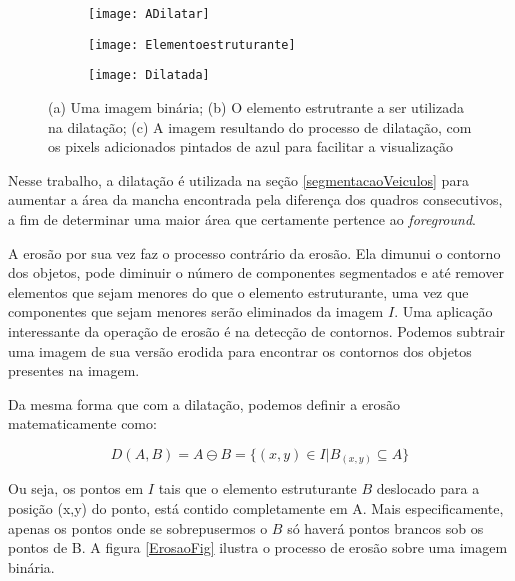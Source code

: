     \begin{figure}
 \centering
\begin{subfigure}{.5\textwidth}
  \centering
  \texttt{[image: ADilatar]}
  \caption{}
  \label{Dilatacao:sfig1}
\end{subfigure}%
\begin{subfigure}{.5\textwidth}
  \centering
  \texttt{[image: Elementoestruturante]}
  \caption{}
  \label{Dilatacao:sfig2}
\end{subfigure}


\begin{subfigure}{.5\textwidth}
  \centering
  \texttt{[image: Dilatada]}
  \caption{}
  \label{Dilatacao:sfig3}
\end{subfigure}
\caption{(a) Uma imagem binária; (b) O elemento estrutrante a ser utilizada na dilatação; (c) A imagem resultando do processo de dilatação, com os pixels adicionados pintados de azul para facilitar a visualização}
\label{DilatacaoFig}
\end{figure}


    Nesse trabalho, a dilatação é utilizada na seção \ref{segmentacaoVeiculos} para aumentar a área da mancha encontrada pela diferença dos quadros consecutivos, a fim de determinar uma maior área que certamente pertence ao \textit{foreground}.

    A erosão por sua vez faz o processo contrário da erosão. Ela dimunui o contorno dos objetos, pode diminuir o número de componentes segmentados e até remover elementos que sejam menores do que o elemento estruturante, uma vez que componentes que sejam menores serão eliminados da imagem $I$. Uma aplicação interessante da operação de erosão é na detecção de contornos. Podemos subtrair uma imagem de sua versão erodida para encontrar os contornos dos objetos presentes na imagem.

    Da mesma forma que com a dilatação, podemos definir a erosão matematicamente como:

    \begin{equation}\label{conjuntoErosao}
      D(A,B) = A \ominus B = \{{(x,y) \in I | B_{(x,y)} \subseteq A}\}
    \end{equation}

    Ou seja, os pontos em $I$ tais que o elemento estruturante $B$ deslocado para a posição (x,y) do ponto, está contido completamente em A. Mais especificamente, apenas os pontos onde se sobrepusermos o $B$ só haverá pontos brancos sob os pontos de B. A figura \ref{ErosaoFig} ilustra o processo de erosão sobre uma imagem binária.

